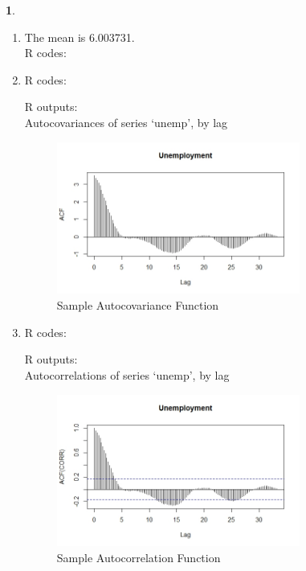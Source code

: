 \documentclass[10pt]{article}
\newtheorem{prob}{\bm{$Problem$}}
\begin{document}
\begin{prob}
\end{prob}
\begin{enumerate}[1)]
\vspace{3mm}

\item
The mean is 6.003731.\\
R codes:

\vspace{3mm}

\item
R codes:

R outputs:\\
Autocovariances of series `unemp', by lag

\begin{figure}[H]
  \centering
  \includegraphics[width=8cm,height=5cm]{p32a.jpeg}
  \caption{Sample Autocovariance Function}
\end{figure}
\vspace{3mm}

\item
R codes:

R outputs:\\
Autocorrelations of series `unemp', by lag

\begin{figure}[H]
  \centering
  \includegraphics[width=8cm,height=5cm]{p33a.jpeg}
  \caption{Sample Autocorrelation Function}
\end{figure}
\vspace{3mm}


\end{enumerate}
\end{document}

